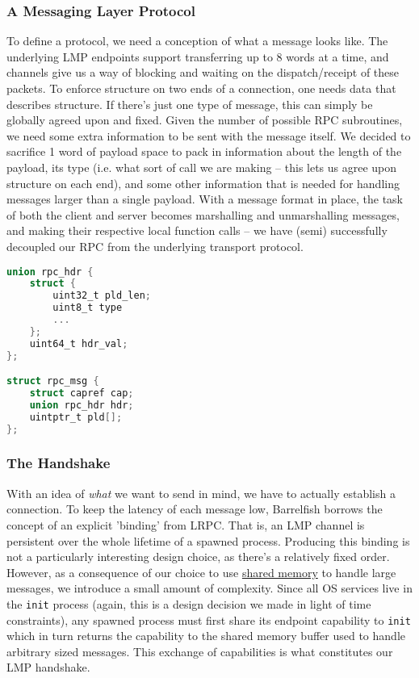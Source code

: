\subsubsection*{A Messaging Layer Protocol} \label{msg_protocol}

To define a protocol, we need a conception of what a message looks like. The underlying LMP endpoints support transferring up to 8 words at a time, and channels give us a way of blocking and waiting on the dispatch/receipt of these packets. To enforce structure on two ends of a connection, one needs data that describes structure. If there's just one type of message, this can simply be globally agreed upon and fixed.  Given the number of possible RPC subroutines, we need some extra information to be sent with the message itself. We decided to sacrifice 1 word of payload space to pack in information about the length of the payload, its type (i.e. what sort of call we are making -- this lets us agree upon structure on each end), and some other information that is needed for handling messages larger than a single payload. With a message format in place, the task of both the client and server becomes marshalling and unmarshalling messages, and making their respective local function calls -- we have (semi) successfully decoupled our RPC from the underlying transport protocol.

\begin{lstlisting}[caption={RPC Structs}, label=lst:rpc_structs, language=C]
union rpc_hdr {
    struct {
        uint32_t pld_len;
        uint8_t type
        ...
    };
    uint64_t hdr_val;
};

struct rpc_msg {
    struct capref cap;
    union rpc_hdr hdr;
    uintptr_t pld[];
};
\end{lstlisting}

\subsubsection*{The Handshake} \label{handshake}

With an idea of \textit{what} we want to send in mind, we have to actually establish a connection. To keep the latency of each message low, Barrelfish borrows the concept of an explicit 'binding' from LRPC. That is, an LMP channel is persistent over the whole lifetime of a spawned process. Producing this binding is not a particularly interesting design choice, as there's a relatively fixed order. However, as a consequence of our choice to use \hyperref[sec:extending]{shared memory} to handle large messages, we introduce a small amount of complexity. Since all OS services live in the \verb|init| process (again, this is a design decision we made in light of time constraints), any spawned process must first share its endpoint capability to \verb|init| which in turn returns the capability to the shared memory buffer used to handle arbitrary sized messages. This exchange of capabilities is what constitutes our LMP handshake.

